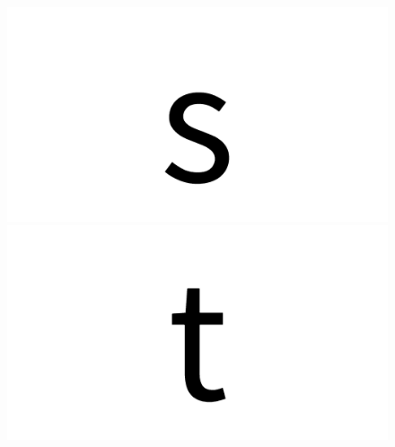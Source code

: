 \documentclass{article}
\begin{document}
\begin{figure}[H]
  \includegraphics[width=\linewidth]{s}
\endminipage\hfill
{}
  \includegraphics[width=\linewidth]{t}
\endminipage\hfill
\end{figure}

\clearpage
\end{document}
